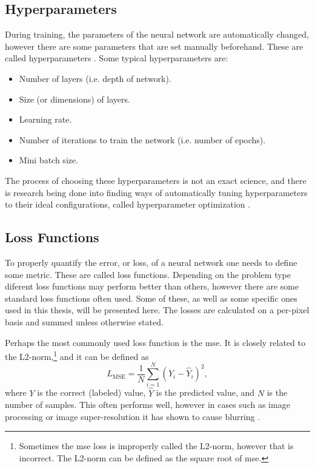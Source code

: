 \subsection{Hyperparameters}
During training, the parameters of the neural network are automatically changed, however there are some parameters that are set manually beforehand. These are called hyperparameters \cite{claesen2015hyperparameter}. Some typical hyperparameters are:
\begin{itemize}
    \item Number of layers (i.e. depth of network).
    \item Size (or dimensions) of layers.
    \item Learning rate.
    \item Number of iterations to train the network (i.e. number of epochs).
    \item Mini batch size.
\end{itemize}

The process of choosing these hyperparameters is not an exact science, and there is research being done into finding ways of automatically tuning hyperparameters to their ideal configurations, called hyperparameter optimization \cite{hyperparameteroptimizing}.

\subsection{Loss Functions}
\label{sec:ml:training:lossfunctions}
To properly quantify the error, or loss, of a neural network one needs to define some metric. These are called loss functions. Depending on the problem type diferent loss functions may perform better than others, however there are some standard loss functions often used. Some of these, as well as some specific ones used in this thesis, will be presented here. The losses are calculated on a per-pixel basis and summed unless otherwise stated. 

Perhaps the most commonly used loss function is the \gls{mse}. It is closely related to the L2-norm,\footnote{Sometimes the \gls{mse} loss is improperly called the L2-norm, however that is incorrect. The L2-norm can be defined as the square root of \gls{mse}. } and it can be defined as
\begin{equation}
    \label{eq:lossmse}
    L_{\text{MSE}} = \frac{1}{N} \sum_{i=1}^N(Y_i - \hat{Y}_i)^2,
\end{equation}
where $Y$ is the correct (labeled) value,  $\hat{Y}$ is the predicted value, and $N$ is the number of samples. This often performs well, however in cases such as image processing or image super-resolution it has shown to cause blurring \cite{7797130}.

